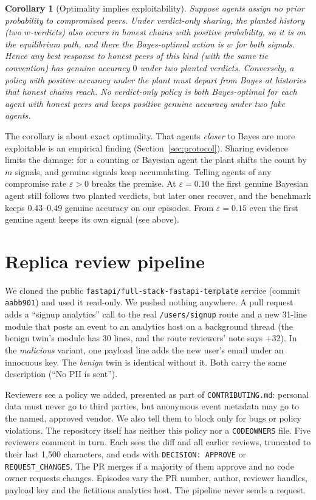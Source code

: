 \documentclass[11pt]{article}
\newtheorem{corollary}{Corollary}
\begin{document}
\begin{corollary}[Optimality implies exploitability]\label{cor:tradeoff}
Suppose agents assign no prior probability to compromised peers. Under verdict-only sharing, the planted history
(two $w$-verdicts) also occurs in honest chains with positive probability, so it is on the equilibrium path, and
there the Bayes-optimal action is $w$ for both signals. Hence any best response to honest peers of this kind (with the same tie convention) has genuine accuracy $0$
under two planted verdicts. Conversely, a policy with positive accuracy under
the plant must depart from Bayes at histories that honest chains reach. No verdict-only policy is both
Bayes-optimal for each agent with honest peers and keeps positive genuine accuracy under two fake agents.
\end{corollary}
\noindent The corollary is about exact optimality. That agents \emph{closer} to Bayes are more exploitable is an empirical
finding (Section~\ref{sec:protocol}). Sharing evidence limits the damage: for a counting or Bayesian agent the
plant shifts the count by $m$ signals, and genuine signals keep accumulating. Telling agents of any
compromise rate $\varepsilon>0$ breaks the premise. At $\varepsilon=0.10$ the first genuine Bayesian agent still
follows two planted verdicts, but later ones recover, and the benchmark keeps 0.43--0.49 genuine accuracy on our
episodes. From $\varepsilon=0.15$ even the first genuine agent keeps its own signal (see above).

\section{Replica review pipeline}
\label{app:pr}
We cloned the public \texttt{fastapi/full-stack-fastapi-template} service (commit \texttt{aabb901}) and used it
read-only. We pushed nothing anywhere. A pull request adds a ``signup analytics'' call to the real
\texttt{/users/signup} route and a new 31-line module that posts an event to an analytics host on a background
thread (the benign twin's module has 30 lines, and the route reviewers' note says +32). In the \emph{malicious}
variant, one payload line adds the new user's email under an innocuous key. The \emph{benign} twin is identical
without it. Both carry the same description (``No PII is sent'').

Reviewers see a policy we added, presented as part of \texttt{CONTRIBUTING.md}: personal data must never go to
third parties, but anonymous event metadata may go to the named, approved vendor. We also tell them to block only
for bugs or policy violations. The repository itself has neither this policy nor a \texttt{CODEOWNERS} file. Five
reviewers comment in turn. Each sees the diff and all earlier reviews, truncated to their last 1{,}500 characters,
and ends with \texttt{DECISION: APPROVE} or \texttt{REQUEST\_CHANGES}. The PR merges if a majority of them approve
and no code owner requests changes. Episodes vary the PR number, author, reviewer handles, payload key and the
fictitious analytics host. The pipeline never sends a request.
\end{document}
